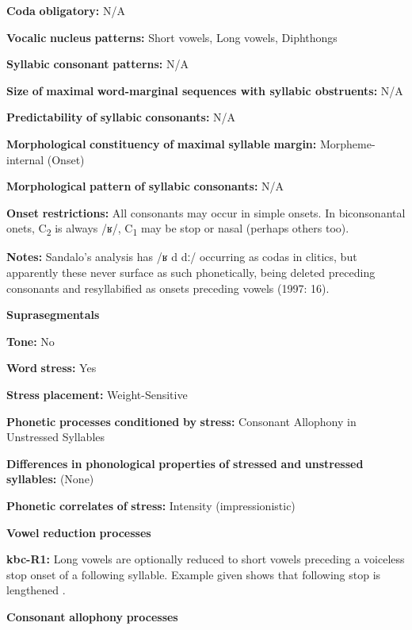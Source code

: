 \begin{styleBody}
\textbf{Coda} \textbf{obligatory:} N/A

\textbf{Vocalic} \textbf{nucleus} \textbf{patterns:} Short vowels, Long vowels, Diphthongs

\textbf{Syllabic} \textbf{consonant} \textbf{patterns:} N/A

\textbf{Size} \textbf{of} \textbf{maximal} \textbf{word{}-marginal sequences with syllabic obstruents:} N/A

\textbf{Predictability} \textbf{of} \textbf{syllabic} \textbf{consonants:} N/A

\textbf{Morphological} \textbf{constituency} \textbf{of} \textbf{maximal} \textbf{syllable} \textbf{margin:} Morpheme-internal (Onset)

\textbf{Morphological} \textbf{pattern} \textbf{of} \textbf{syllabic} \textbf{consonants:} N/A

\textbf{Onset} \textbf{restrictions:} All consonants may occur in simple onsets. In biconsonantal onets, C\textsubscript{2} is always /ʁ/, C\textsubscript{1} may be stop or nasal (perhaps others too).

\textbf{Notes:} Sandalo’s analysis has /ʁ d dː/ occurring as codas in clitics, but apparently these never surface as such phonetically, being deleted preceding consonants and resyllabified as onsets preceding vowels (1997: 16).

\textbf{Suprasegmentals}

\textbf{Tone:} No

\textbf{Word} \textbf{stress:} Yes

\textbf{Stress} \textbf{placement:} Weight-Sensitive

\textbf{Phonetic} \textbf{processes} \textbf{conditioned} \textbf{by} \textbf{stress:} Consonant Allophony in Unstressed Syllables

\textbf{Differences} \textbf{in} \textbf{phonological} \textbf{properties} \textbf{of} \textbf{stressed} \textbf{and} \textbf{unstressed} \textbf{syllables:} (None)

\textbf{Phonetic} \textbf{correlates} \textbf{of} \textbf{stress:} Intensity (impressionistic)

\textbf{Vowel} \textbf{reduction} \textbf{processes}

\textbf{kbc-R1:} Long vowels are optionally reduced to short vowels preceding a voiceless stop onset of a following syllable. Example given shows that following stop is lengthened \citep[17]{Sandalo1997}.

\textbf{Consonant} \textbf{allophony} \textbf{processes}


\end{styleBody}
